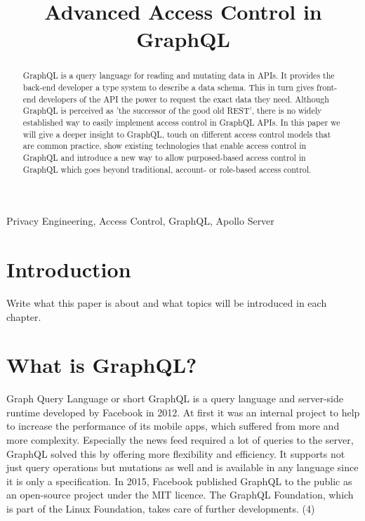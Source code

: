 \documentclass[conference]{IEEEtran}
\begin{document}
\title{Advanced Access Control in GraphQL\\}

\author{
\and
{}
\and
{}
}

\maketitle

\begin{abstract}
GraphQL is a query language for reading and mutating data in APIs. It provides the back-end developer a type system to describe a data schema. This in turn gives front-end developers of the API the power to request the exact data they need. Although GraphQL is perceived as 'the successor of the good old REST', there is no widely established way to easily implement access control in GraphQL APIs. In this paper we will give a deeper insight to GraphQL, touch on different access control models that are common practice, show existing technologies that enable access control in GraphQL and introduce a new way to allow purposed-based access control in GraphQL which goes beyond traditional, account- or role-based access control.

\end{abstract}

\begin{IEEEkeywords}
Privacy Engineering, Access Control, GraphQL, Apollo Server
\end{IEEEkeywords}

\section{Introduction}\label{intro}
Write what this paper is about and what topics will be introduced in each chapter.

\section{What is GraphQL?}\label{basic}

Graph Query Language or short GraphQL is a query language and server-side runtime developed by Facebook in 2012. At first it was an internal project to help to increase the performance of its mobile apps, which suffered from more and more complexity. Especially the news feed required a lot of queries to the server, GraphQL solved this by offering more flexibility and efficiency. It supports not just query operations but mutations as well and is available in any language since it is only a specification. In 2015, Facebook published GraphQL to the public as an open-source project under the MIT licence. The GraphQL Foundation, which is part of the Linux Foundation, takes care of further developments. (4)
\end{document}
